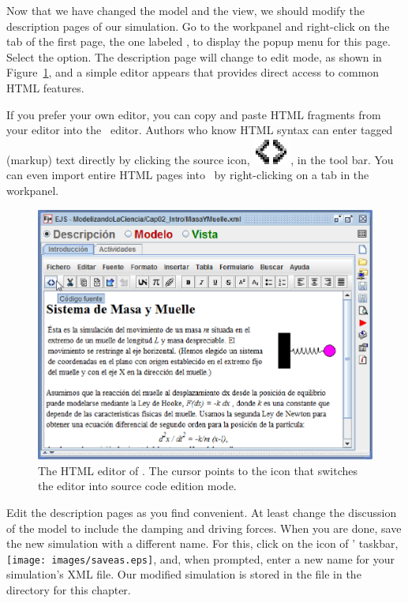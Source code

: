 Now that we have changed the model and the view, we should modify the description pages of our simulation. Go to the  workpanel and right-click on the tab of the first page, the one labeled , to display the popup menu for this page. Select the  option. The description page will change to edit mode, as shown in Figure~\ref{fig:02EjsIntro/ModifyHTML}, and a simple editor appears that provides direct access to common HTML features.

If you prefer your own editor, you can copy and paste HTML fragments from your editor into the \ejs\ editor. Authors who know HTML syntax can enter tagged (markup) text directly by clicking the source icon, \includegraphics[scale=\linescale]{02EjsIntro/images/SourceHK.eps}, in the tool bar.  You can even import entire HTML pages into \ejs\ by right-clicking on a tab in the workpanel.


\begin{figure}[htb]
    \centering
  \includegraphics[scale=\scale]{02EjsIntro/images/ModifyHTML.eps}
    \caption{The HTML editor of \ejs. The cursor points to the icon that switches the editor into source code edition mode.}
    \label{fig:02EjsIntro/ModifyHTML}
\end{figure}

Edit the description pages as you find convenient. At least change the discussion of the model to include the damping and driving forces. When you are done, save the new simulation with a different name. For this, click on the  icon of \ejs' taskbar, \texttt{[image: images/saveas.eps]}, and, when prompted, enter a new name for your simulation's XML file. Our modified simulation is stored in the  file in the  directory for this chapter.

